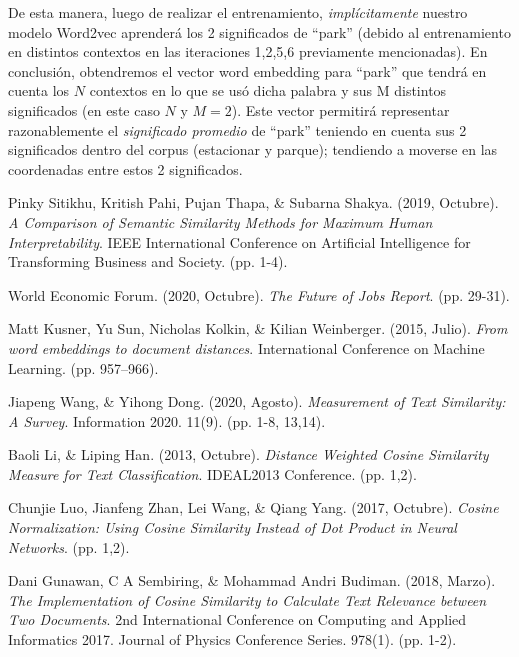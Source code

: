\documentclass[12pt,a4paper]{article}
\begin{document}
\begin{sloppypar}
De esta manera, luego de realizar el entrenamiento, \textit{implícitamente} nuestro modelo Word2vec aprenderá los 2 significados de “park” (debido al entrenamiento en distintos contextos en las iteraciones 1,2,5,6 previamente mencionadas). En conclusión, obtendremos el vector word embedding para “park” que tendrá en cuenta los $N$ contextos en lo que se usó dicha palabra y sus M distintos significados (en este caso $N$ y $M = 2$). Este vector permitirá representar razonablemente el \textit{significado promedio} de “park” teniendo en cuenta sus 2 significados dentro del corpus (estacionar y parque); tendiendo a moverse en las coordenadas entre estos 2 significados.

\cleardoublepage

\begin{thebibliography}{9}

Pinky Sitikhu, Kritish Pahi, Pujan Thapa, \& Subarna Shakya. (2019, Octubre). \textit{A Comparison of Semantic Similarity Methods for Maximum Human Interpretability}. IEEE International Conference on Artificial Intelligence for Transforming Business and Society. (pp. 1-4).

World Economic Forum. (2020, Octubre). \textit{The Future of Jobs Report}. (pp. 29-31).

Matt Kusner, Yu Sun, Nicholas Kolkin, \& Kilian Weinberger. (2015, Julio). \textit{From word embeddings to document distances}. International Conference on Machine Learning. (pp. 957–966).

Jiapeng Wang, \& Yihong Dong. (2020, Agosto). \textit{Measurement of Text Similarity: A Survey}. Information 2020. 11(9). (pp. 1-8, 13,14).

Baoli Li, \& Liping Han. (2013, Octubre). \textit{Distance Weighted Cosine Similarity Measure for Text Classification}. IDEAL2013 Conference. (pp. 1,2).

Chunjie Luo, Jianfeng Zhan, Lei Wang, \& Qiang Yang. (2017, Octubre). \textit{Cosine Normalization: Using Cosine Similarity Instead of Dot Product in Neural Networks}. (pp. 1,2).

Dani Gunawan, C A Sembiring, \& Mohammad Andri Budiman. (2018, Marzo). \textit{The Implementation of Cosine Similarity to Calculate Text Relevance between Two Documents}. 2nd International Conference on Computing and Applied Informatics 2017. Journal of Physics Conference Series. 978(1). (pp. 1-2).


\end{thebibliography}
\end{sloppypar}
\end{document}
